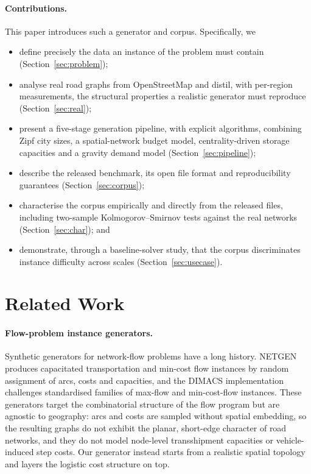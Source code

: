 \documentclass[runningheads]{llncs}
\begin{document}
\paragraph{Contributions.}
This paper introduces such a generator and corpus. Specifically, we
\begin{itemize}
\item define precisely the data an instance of the problem must contain
      (Section~\ref{sec:problem});
\item analyse real road graphs from OpenStreetMap and distil, with per-region
      measurements, the structural properties a realistic generator must
      reproduce (Section~\ref{sec:real});
\item present a five-stage generation pipeline, with explicit algorithms,
      combining Zipf city sizes, a spatial-network budget model,
      centrality-driven storage capacities and a gravity demand model
      (Section~\ref{sec:pipeline});
\item describe the released benchmark, its open file format and reproducibility
      guarantees (Section~\ref{sec:corpus});
\item characterise the corpus empirically and directly from the released files,
      including two-sample Kolmogorov--Smirnov tests against the real networks
      (Section~\ref{sec:char}); and
\item demonstrate, through a baseline-solver study, that the corpus
      discriminates instance difficulty across scales
      (Section~\ref{sec:usecase}).
\end{itemize}
\section{Related Work}
\label{sec:related}

\paragraph{Flow-problem instance generators.}
Synthetic generators for network-flow problems have a long history. NETGEN
\cite{netgen} produces capacitated transportation and min-cost flow instances by
random assignment of arcs, costs and capacities, and the DIMACS implementation
challenges \cite{dimacs} standardised families of max-flow and min-cost-flow
instances. These generators target the combinatorial structure of the flow
program but are agnostic to geography: arcs and costs are sampled without
spatial embedding, so the resulting graphs do not exhibit the planar, short-edge
character of road networks, and they do not model node-level transshipment
capacities or vehicle-induced step costs. Our generator instead starts from a
realistic spatial topology and layers the logistic cost structure on top.
\end{document}
